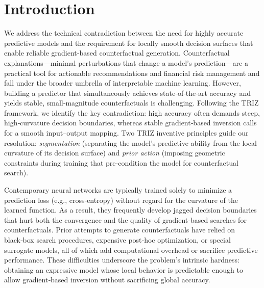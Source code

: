 \documentclass[11pt,a4paper]{article}
\begin{document}
\section{Introduction}
\label{sec:intro}
We address the technical contradiction between the need for highly accurate predictive models and the requirement for locally smooth decision surfaces that enable reliable gradient‑based counterfactual generation.
Counterfactual explanations---minimal perturbations that change a model’s prediction---are a practical tool for actionable recommendations and financial risk management and fall under the broader umbrella of interpretable machine learning.
However, building a predictor that simultaneously achieves state‑of‑the‑art accuracy and yields stable, small‑magnitude counterfactuals is challenging.
Following the TRIZ framework, we identify the key contradiction: high accuracy often demands steep, high‑curvature decision boundaries, whereas stable gradient‑based inversion calls for a smooth input–output mapping.
Two TRIZ inventive principles guide our resolution: \emph{segmentation} (separating the model’s predictive ability from the local curvature of its decision surface) and \emph{prior action} (imposing geometric constraints during training that pre‑condition the model for counterfactual search).

Contemporary neural networks are typically trained solely to minimize a prediction loss (e.g., cross‑entropy) without regard for the curvature of the learned function.
As a result, they frequently develop jagged decision boundaries that hurt both the convergence and the quality of gradient‑based searches for counterfactuals.
Prior attempts to generate counterfactuals have relied on black‑box search procedures, expensive post‑hoc optimization, or special surrogate models, all of which add computational overhead or sacrifice predictive performance.
These difficulties underscore the problem’s intrinsic hardness: obtaining an expressive model whose local behavior is predictable enough to allow gradient‑based inversion without sacrificing global accuracy.
\end{document}
